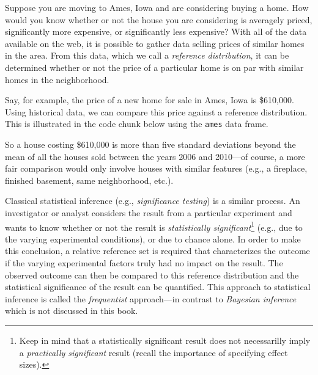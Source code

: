 \documentclass[]{book}
\newenvironment{Shaded}{\begin{snugshade}}{\end{snugshade}}
\newcommand{\CommentTok}[1]{\textcolor[rgb]{0.56,0.35,0.01}{\textit{#1}}}
\newcommand{\DecValTok}[1]{\textcolor[rgb]{0.00,0.00,0.81}{#1}}
\newcommand{\KeywordTok}[1]{\textcolor[rgb]{0.13,0.29,0.53}{\textbf{#1}}}
\newcommand{\NormalTok}[1]{#1}
\newcommand{\OperatorTok}[1]{\textcolor[rgb]{0.81,0.36,0.00}{\textbf{#1}}}
\newcommand{\StringTok}[1]{\textcolor[rgb]{0.31,0.60,0.02}{#1}}
\let\rmarkdownfootnote\footnote%
\def\footnote{\protect\rmarkdownfootnote}
\theoremstyle{definition}
\theoremstyle{definition}
\theoremstyle{definition}
\theoremstyle{remark}
\begin{document}
Suppose you are moving to Ames, Iowa and are considering buying a home.
How would you know whether or not the house you are considering is
averagely priced, significantly more expensive, or significantly less
expensive? With all of the data available on the web, it is possible to
gather data selling prices of similar homes in the area. From this data,
which we call a \emph{reference distribution}, it can be determined
whether or not the price of a particular home is on par with similar
homes in the neighborhood.

Say, for example, the price of a new home for sale in Ames, Iowa is
\$610,000. Using historical data, we can compare this price against a
reference distribution. This is illustrated in the code chunk below
using the \texttt{ames} data frame.

\begin{Shaded}
\end{Shaded}

So a house costing \$610,000 is more than five standard deviations
beyond the mean of all the houses sold between the years 2006 and
2010---of course, a more fair comparison would only involve houses with
similar features (e.g., a fireplace, finished basement, same
neighborhood, etc.).

Classical statistical inference (e.g., \emph{significance testing}) is a
similar process. An investigator or analyst considers the result from a
particular experiment and wants to know whether or not the result is
\emph{statistically significant}\footnote{Keep in mind that a
  statistically significant result does not necessarilly imply a
  \emph{practically significant} result (recall the importance of
  specifying effect sizes).} (e.g., due to the varying experimental
conditions), or due to chance alone. In order to make this conclusion, a
relative reference set is required that characterizes the outcome if the
varying experimental factors truly had no impact on the result. The
observed outcome can then be compared to this reference distribution and
the statistical significance of the result can be quantified. This
approach to statistical inference is called the \emph{frequentist}
approach---in contrast to \emph{Bayesian inference} which is not
discussed in this book.
\end{document}
